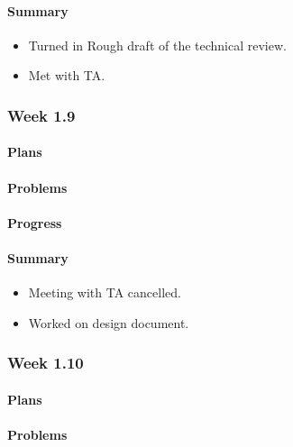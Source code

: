 \documentclass[onecolumn, draftclsnofoot,10pt, compsoc]{article}
\begin{document}
		    \paragraph{Summary}
		    \begin{itemize}
		    \item Turned in Rough draft of the technical review.
            \item Met with TA.
            \end{itemize}

		    
		\subsubsection{Week 1.9}
		
			\paragraph{Plans} \hfill \break

		    \paragraph{Problems} \hfill \break

		    \paragraph{Progress} \hfill \break

		    \paragraph{Summary} \hfill \break
		    \begin{itemize}
                \item Meeting with TA cancelled.  
                \item Worked on design document. \\
		     \end{itemize}
		\subsubsection{Week 1.10}
		
		    \paragraph{Plans} \hfill \break

		    \paragraph{Problems} \hfill \break
\end{document}
